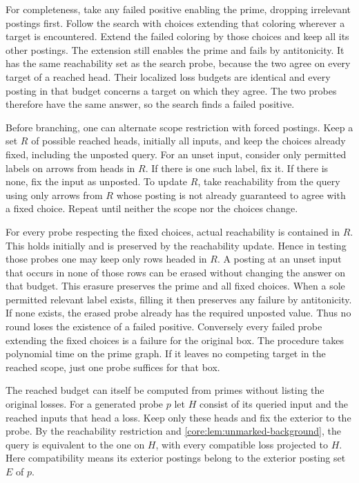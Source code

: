 For completeness, take any failed positive enabling
the prime, dropping irrelevant postings first.
Follow the search with choices extending that
coloring wherever a target is encountered. Extend
the failed coloring by those choices and keep all
its other postings. The extension still enables
the prime and fails by antitonicity. It has the same
reachability set as the search probe, because the
two agree on every target of a reached head. Their
localized loss budgets are identical and every
posting in that budget concerns a target on which
they agree. The two probes therefore have the same
answer, so the search finds a failed positive.

Before branching, one can alternate scope restriction
with forced postings. Keep a set $R$ of possible reached
heads, initially all inputs, and keep the choices already
fixed, including the unposted query. For an unset input,
consider only permitted labels on arrows from heads in
$R$. If there is one such label, fix it. If there is none,
fix the input as unposted. To update $R$, take reachability
from the query using only arrows from $R$ whose posting is
not already guaranteed to agree with a fixed choice.
Repeat until neither the scope nor the choices change.

For every probe respecting the fixed choices, actual
reachability is contained in $R$. This holds initially
and is preserved by the reachability update. Hence in
testing those probes one may keep only rows headed in
$R$. A posting at an unset input that occurs in none of
those rows can be erased without changing the answer on
that budget. This erasure preserves the prime and all
fixed choices. When a sole permitted relevant label
exists, filling it then preserves any failure by
antitonicity. If none exists, the erased probe already
has the required unposted value. Thus no round loses
the existence of a failed positive. Conversely every
failed probe extending the fixed choices is a failure
for the original box. The procedure takes polynomial
time on the prime graph. If it leaves no competing
target in the reached scope, just one probe suffices
for that box.

The reached budget can itself be computed from primes
without listing the original losses. For a generated
probe $p$ let $H$ consist of its queried input and the
reached inputs that head a loss. Keep only these heads
and fix the exterior to the probe. By the reachability
restriction and \cref{core:lem:unmarked-background},
the query is equivalent to the one on $H$, with every
compatible loss projected to $H$. Here compatibility
means its exterior postings belong to the exterior
posting set $E$ of $p$.


